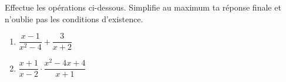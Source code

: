 %
%
    Effectue les opérations ci-dessous. Simplifie au maximum ta réponse finale et n'oublie pas les conditions d'existence.
    \begin{enumerate}[cols=2]
        \item %
              $\dfrac{x-1}{x^2-4} + \dfrac{3}{x+2}$
        \item %
              $\dfrac{x+1}{x-2}\cdot\dfrac{x^2-4x+4}{x+1}$
    \end{enumerate}

